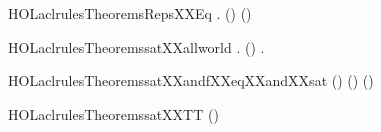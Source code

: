 \newcommand{\HOLaclrulesTheoremsrepsXXdefXXlemma}{\UseVerbatim{HOLaclrulesTheoremsrepsXXdefXXlemma}}
\begin{SaveVerbatim}{HOLaclrulesTheoremsRepsXXEq}
\HOLTokenTurnstile{} \HOLSymConst{\HOLTokenForall{}}     .
     (\HOLSymConst{,}\HOLSymConst{,})      \HOLSymConst{\HOLTokenEquiv{}}
     (\HOLSymConst{,}\HOLSymConst{,})          
\end{SaveVerbatim}
\newcommand{\HOLaclrulesTheoremsRepsXXEq}{\UseVerbatim{HOLaclrulesTheoremsRepsXXEq}}
\begin{SaveVerbatim}{HOLaclrulesTheoremssatXXallworld}
\HOLTokenTurnstile{} \HOLSymConst{\HOLTokenForall{}} . (\HOLSymConst{,}\HOLSymConst{,})   \HOLSymConst{\HOLTokenEquiv{}} \HOLSymConst{\HOLTokenForall{}}.  \HOLConst{\HOLTokenIn{}}     
\end{SaveVerbatim}
\newcommand{\HOLaclrulesTheoremssatXXallworld}{\UseVerbatim{HOLaclrulesTheoremssatXXallworld}}
\begin{SaveVerbatim}{HOLaclrulesTheoremssatXXandfXXeqXXandXXsat}
\HOLTokenTurnstile{} (\HOLSymConst{,}\HOLSymConst{,})     \HOLSymConst{\HOLTokenEquiv{}}
   (\HOLSymConst{,}\HOLSymConst{,})   \HOLSymConst{\HOLTokenConj{}} (\HOLSymConst{,}\HOLSymConst{,})  
\end{SaveVerbatim}
\newcommand{\HOLaclrulesTheoremssatXXandfXXeqXXandXXsat}{\UseVerbatim{HOLaclrulesTheoremssatXXandfXXeqXXandXXsat}}
\begin{SaveVerbatim}{HOLaclrulesTheoremssatXXTT}
\HOLTokenTurnstile{} (\HOLSymConst{,}\HOLSymConst{,})  
\end{SaveVerbatim}

